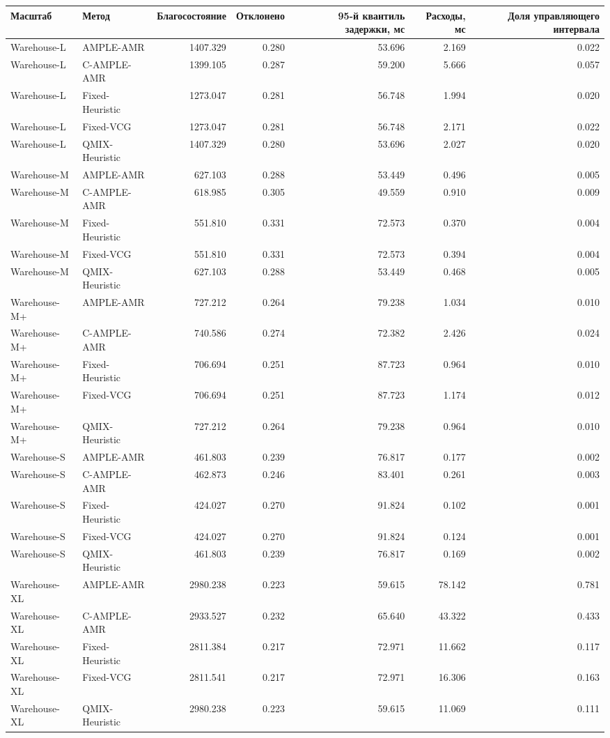 \begin{tabular}{llrrrrr}
\toprule
 Масштаб & Метод & Благосостояние & Отклонено & 95-й квантиль задержки, мс & Расходы, мс & Доля управляющего интервала \\
\midrule
 Warehouse-L & AMPLE-AMR & 1407.329 & 0.280 & 53.696 & 2.169 & 0.022 \\
 Warehouse-L & C-AMPLE-AMR & 1399.105 & 0.287 & 59.200 & 5.666 & 0.057 \\
 Warehouse-L & Fixed-Heuristic & 1273.047 & 0.281 & 56.748 & 1.994 & 0.020 \\
 Warehouse-L & Fixed-VCG & 1273.047 & 0.281 & 56.748 & 2.171 & 0.022 \\
 Warehouse-L & QMIX-Heuristic & 1407.329 & 0.280 & 53.696 & 2.027 & 0.020 \\
 Warehouse-M & AMPLE-AMR & 627.103 & 0.288 & 53.449 & 0.496 & 0.005 \\
 Warehouse-M & C-AMPLE-AMR & 618.985 & 0.305 & 49.559 & 0.910 & 0.009 \\
 Warehouse-M & Fixed-Heuristic & 551.810 & 0.331 & 72.573 & 0.370 & 0.004 \\
 Warehouse-M & Fixed-VCG & 551.810 & 0.331 & 72.573 & 0.394 & 0.004 \\
 Warehouse-M & QMIX-Heuristic & 627.103 & 0.288 & 53.449 & 0.468 & 0.005 \\
 Warehouse-M+ & AMPLE-AMR & 727.212 & 0.264 & 79.238 & 1.034 & 0.010 \\
 Warehouse-M+ & C-AMPLE-AMR & 740.586 & 0.274 & 72.382 & 2.426 & 0.024 \\
 Warehouse-M+ & Fixed-Heuristic & 706.694 & 0.251 & 87.723 & 0.964 & 0.010 \\
 Warehouse-M+ & Fixed-VCG & 706.694 & 0.251 & 87.723 & 1.174 & 0.012 \\
 Warehouse-M+ & QMIX-Heuristic & 727.212 & 0.264 & 79.238 & 0.964 & 0.010 \\
 Warehouse-S & AMPLE-AMR & 461.803 & 0.239 & 76.817 & 0.177 & 0.002 \\
 Warehouse-S & C-AMPLE-AMR & 462.873 & 0.246 & 83.401 & 0.261 & 0.003 \\
 Warehouse-S & Fixed-Heuristic & 424.027 & 0.270 & 91.824 & 0.102 & 0.001 \\
 Warehouse-S & Fixed-VCG & 424.027 & 0.270 & 91.824 & 0.124 & 0.001 \\
 Warehouse-S & QMIX-Heuristic & 461.803 & 0.239 & 76.817 & 0.169 & 0.002 \\
 Warehouse-XL & AMPLE-AMR & 2980.238 & 0.223 & 59.615 & 78.142 & 0.781 \\
 Warehouse-XL & C-AMPLE-AMR & 2933.527 & 0.232 & 65.640 & 43.322 & 0.433 \\
 Warehouse-XL & Fixed-Heuristic & 2811.384 & 0.217 & 72.971 & 11.662 & 0.117 \\
 Warehouse-XL & Fixed-VCG & 2811.541 & 0.217 & 72.971 & 16.306 & 0.163 \\
 Warehouse-XL & QMIX-Heuristic & 2980.238 & 0.223 & 59.615 & 11.069 & 0.111 \\
\bottomrule
\end{tabular}
